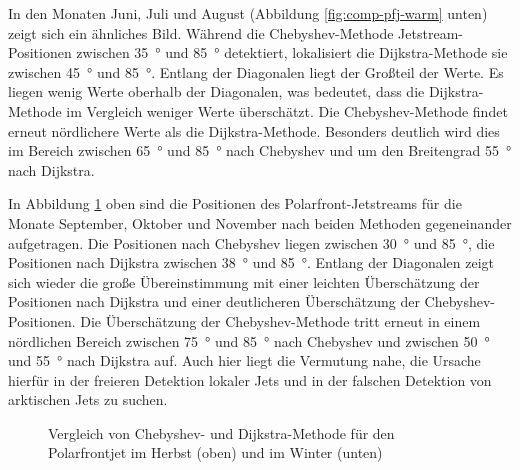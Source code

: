 In den Monaten Juni, Juli und August (Abbildung \ref{fig:comp-pfj-warm} unten)  zeigt sich ein ähnliches Bild. Während die Chebyshev-Methode Jetstream-Positionen zwischen \SI{35}{\degree} und \SI{85}{\degree} detektiert, lokalisiert die Dijkstra-Methode sie zwischen \SI{45}{\degree} und \SI{85}{\degree}. Entlang der Diagonalen liegt der Großteil der Werte. Es liegen wenig Werte oberhalb der Diagonalen, was bedeutet, dass die Dijkstra-Methode im Vergleich weniger Werte überschätzt. Die Chebyshev-Methode findet erneut nördlichere Werte als die Dijkstra-Methode. Besonders deutlich wird dies im Bereich zwischen \SI{65}{\degree} und \SI{85}{\degree} nach Chebyshev und um den Breitengrad \SI{55}{\degree} nach Dijkstra.

In Abbildung \ref{fig:comp-pfj-cold} oben sind die Positionen des Polarfront-Jetstreams für die Monate September, Oktober und November nach beiden Methoden gegeneinander aufgetragen. Die Positionen nach Chebyshev liegen zwischen \SI{30}{\degree} und \SI{85}{\degree}, die Positionen nach Dijkstra zwischen \SI{38}{\degree} und \SI{85}{\degree}. Entlang der Diagonalen zeigt sich wieder die große Übereinstimmung mit einer leichten Überschätzung der Positionen nach Dijkstra und einer deutlicheren Überschätzung der Chebyshev-Positionen. Die Überschätzung der Chebyshev-Methode tritt erneut in einem nördlichen Bereich zwischen \SI{75}{\degree} und \SI{85}{\degree} nach Chebyshev und zwischen \SI{50}{\degree} und \SI{55}{\degree} nach Dijkstra auf. Auch hier liegt die Vermutung nahe, die Ursache hierfür in der freieren Detektion lokaler Jets und in der falschen Detektion von arktischen Jets zu suchen.

\begin{figure}[hbt] 
  \centering
  \begin{minipage}{\textwidth}
  \centering
  \end{minipage}
  \begin{minipage}{\textwidth}
  \centering
  \end{minipage}
  \caption[Vergleich des Polarfrontjets nach beiden Methoden für Herbst und Winter]{Vergleich von Chebyshev- und Dijkstra-Methode für den Polarfrontjet im Herbst (oben) und im Winter (unten)} \label{fig:comp-pfj-cold}
\end{figure}

